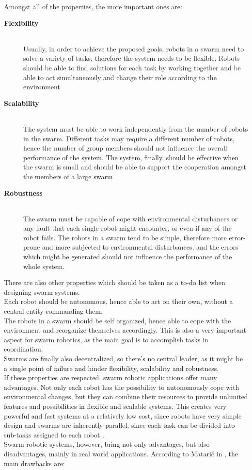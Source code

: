 \documentclass[conference]{IEEEtran}
\begin{document}
Amongst all of the properties, the more important ones are:
\begin{description}
  \item[\textbf{Flexibility}] \hfill\\ Usually, in order to achieve the proposed goals, robots in a swarm need to solve a variety of tasks, therefore the system needs to be flexible. Robots should be able to find solutions for each task by working together and be able to act simultaneously and change their role according to the environment
  \item[\textbf{Scalability}] \hfill \\ The system must be able to work independently from the number of robots in the swarm. Different tasks may require a different number of robots, hence the number of group members should not influence the overall performance of the system. The system, finally, should be effective when the swarm is small and should be able to support the cooperation amongst the members of a large swarm
  \item[\textbf{Robustness}] \hfill \\ The swarm must be capable of cope with environmental disturbances or any fault that each single robot might encounter, or even if any of the robot fails. The robots in a swarm tend to be simple, therefore more error-prone and more subjected to environmental disturbances, and the errors which might be generated should not influence the performance of the whole system. 
\end{description}
There are also other properties which should be taken as a to-do list when designing swarm systems. \cite{cheraghi_past_2021}\\
Each robot should be autonomous, hence able to act on their own, without a central entity commanding them. \\
The robots in a swarm should be self organized, hence able to cope with the environment and reorganize themselves accordingly. This is also a very important aspect for swarm robotics, as the main goal is to accomplish tasks in coordination. \\
Swarms are finally also decentralized, so there's no central leader, as it might be a single point of failure and hinder flexibility, scalability and robustness.\\
If these properties are respected, swarm robotic applications offer many advantages. Not only each robot has the possibility to autonomously cope with environmental changes, but they can combine their resources to provide unlimited features and possibilities in flexible and scalable systems. This creates very powerful and fast systems  at a relatively low cost, since robots have very simple design and swarms are inherently parallel, since each task can be divided into sub-tasks assigned to each robot \cite{cheraghi_past_2021}. \\Swarm robotic systems, however, bring not only advantages, but also disadvantages, mainly in real world applications. According to Matarić in \cite{MATARIC1995321}, the main drawbacks are:
\end{document}
